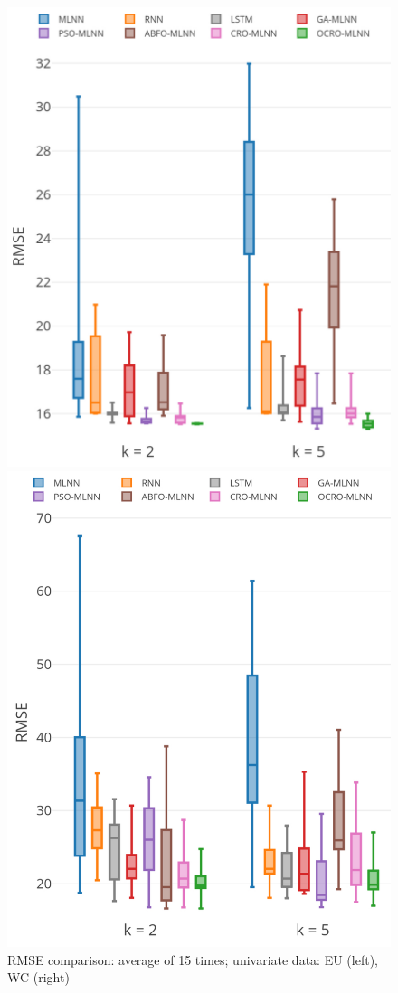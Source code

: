 \documentclass[review,3p,authoryear]{elsarticle}
\begin{document}
{\begin{figure}
	\centering
	\begin{minipage}[t]{8cm}
		\centering
		\includegraphics[width=0.91\textwidth =0cm 0cm 0cm 0cm]{images/pdf/stability/st_eu_2.pdf}
	\end{minipage}
	\begin{minipage}[t]{8cm}
		\centering
		\includegraphics[width=0.87\textwidth =0cm 0cm 0cm 0cm]{images/pdf/stability/st_wc_2.pdf}
	\end{minipage}
	\caption{RMSE comparison: average of 15 times; univariate data: EU (left), WC (right)} 
	\label{fig:stability_uni}
\end{figure}


}
\end{document}
